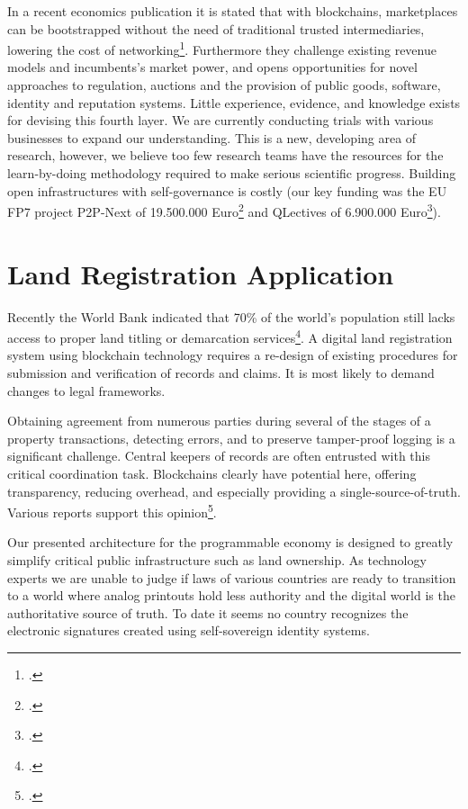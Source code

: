 \documentclass[USenglish]{article}
\begin{document}
In a recent economics publication it is stated that with blockchains, marketplaces can be bootstrapped without the need of traditional trusted intermediaries, lowering the cost of networking\footcite{catalini2016some}.
Furthermore they challenge existing revenue models and incumbents's market power, and opens opportunities for novel approaches to regulation, auctions and the provision of public goods, software, identity and reputation systems.
Little experience, evidence, and knowledge exists for devising this fourth layer.
We are currently conducting trials with various businesses to expand our understanding.
This is a new, developing area of research, however, we believe too few research teams have the resources for the learn-by-doing methodology required to make serious scientific progress.
Building open infrastructures with self-governance is costly (our key funding was the EU FP7 project P2P-Next of 19.500.000 Euro\footcite{p2pnextfunding} and QLectives of 6.900.000 Euro\footcite{qlectivefunding}).

\section{Land Registration Application}

Recently the World Bank indicated that 70\% of the world’s population still lacks access to proper land titling or demarcation services\footcite{ieglandadministration}.
A digital land registration system using blockchain technology requires a re-design of existing procedures for submission and verification of records and claims.
It is most likely to demand changes to legal frameworks.

Obtaining agreement from numerous parties during several of the stages of a property transactions, detecting errors, and to preserve tamper-proof logging is a significant challenge.
Central keepers of records are often entrusted with this critical coordination task.
Blockchains clearly have potential here, offering transparency, reducing overhead, and especially providing a single-source-of-truth.
Various reports support this opinion\footcite{deloitteblockchain}.

Our presented architecture for the programmable economy is designed to greatly simplify critical public infrastructure such as land ownership.
As technology experts we are unable to judge if laws of various countries are ready to transition to a world where analog printouts hold less authority and the digital world is the authoritative source of truth.
To date it seems no country recognizes the electronic signatures created using self-sovereign identity systems.
\end{document}
